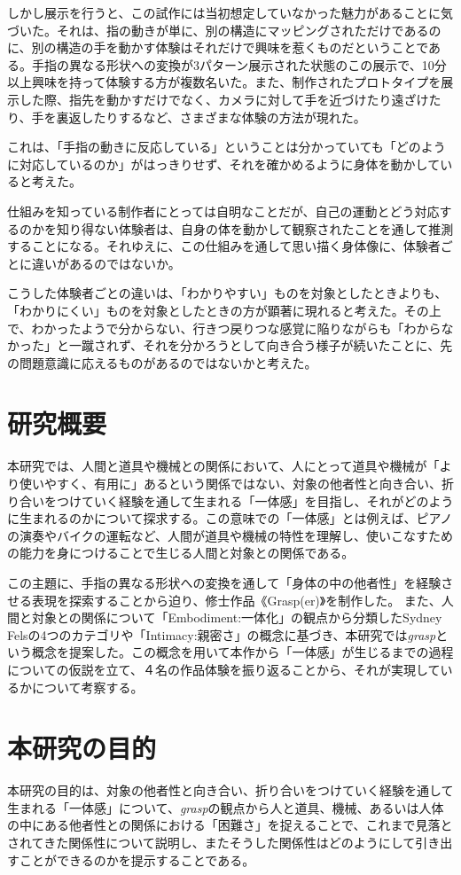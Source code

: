 しかし展示を行うと、この試作には当初想定していなかった魅力があることに気づいた。それは、指の動きが単に、別の構造にマッピングされただけであるのに、別の構造の手を動かす体験はそれだけで興味を惹くものだということである。手指の異なる形状への変換が3パターン展示された状態のこの展示で、10分以上興味を持って体験する方が複数名いた。また、制作されたプロトタイプを展示した際、指先を動かすだけでなく、カメラに対して手を近づけたり遠ざけたり、手を裏返したりするなど、さまざまな体験の方法が現れた。

これは、「手指の動きに反応している」ということは分かっていても「どのように対応しているのか」がはっきりせず、それを確かめるように身体を動かしていると考えた。

仕組みを知っている制作者にとっては自明なことだが、自己の運動とどう対応するのかを知り得ない体験者は、自身の体を動かして観察されたことを通して推測することになる。それゆえに、この仕組みを通して思い描く身体像に、体験者ごとに違いがあるのではないか。

こうした体験者ごとの違いは、「わかりやすい」ものを対象としたときよりも、「わかりにくい」ものを対象としたときの方が顕著に現れると考えた。その上で、わかったようで分からない、行きつ戻りつな感覚に陥りながらも「わからなかった」と一蹴されず、それを分かろうとして向き合う様子が続いたことに、先の問題意識に応えるものがあるのではないかと考えた。


\section{研究概要}
本研究では、人間と道具や機械との関係において、人にとって道具や機械が「より使いやすく、有用に」あるという関係ではない、対象の他者性と向き合い、折り合いをつけていく経験を通して生まれる「一体感」を目指し、それがどのように生まれるのかについて探求する。この意味での「一体感」とは例えば、ピアノの演奏やバイクの運転など、人間が道具や機械の特性を理解し、使いこなすための能力を身につけることで生じる人間と対象との関係である。

この主題に、手指の異なる形状への変換を通して「身体の中の他者性」を経験させる表現を探索することから迫り、修士作品《Grasp(er)》を制作した。
また、人間と対象との関係について「Embodiment:一体化」の観点から分類したSydney Felsの4つのカテゴリや「Intimacy:親密さ」の概念に基づき、本研究では\textit{grasp}という概念を提案した。この概念を用いて本作から「一体感」が生じるまでの過程についての仮説を立て、４名の作品体験を振り返ることから、それが実現しているかについて考察する。

\section{本研究の目的}
本研究の目的は、対象の他者性と向き合い、折り合いをつけていく経験を通して生まれる「一体感」について、\textit{grasp}の観点から人と道具、機械、あるいは人体の中にある他者性との関係における「困難さ」を捉えることで、これまで見落とされてきた関係性について説明し、またそうした関係性はどのようにして引き出すことができるのかを提示することである。

